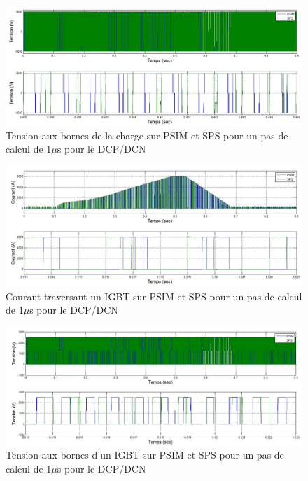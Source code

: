 \begin{figure}[htb]
\centering
\includegraphics[scale=0.5]{fig/DCPDCN/DCPTensionCharge1u.jpg}
\caption{Tension aux bornes de la charge sur PSIM et SPS pour un pas de calcul de 1$\mu$s pour le DCP/DCN}
\label{DC_ch_ten_1}
\end{figure}


\begin{figure}[htb]
\centering
\includegraphics[scale=0.5]{fig/DCPDCN/DCPCourantIGBT1u.jpg}
\caption{Courant traversant un IGBT sur PSIM et SPS pour un pas de calcul de 1$\mu$s pour le DCP/DCN}
\label{DC_IG_cou_1}
\end{figure}


\begin{figure}[htb]
\centering
\includegraphics[scale=0.5]{fig/DCPDCN/DCPTensionIGBT1u.jpg}
\caption{Tension aux bornes d'un IGBT sur PSIM et SPS pour un pas de calcul de 1$\mu$s pour le DCP/DCN}
\label{DC_IG_ten_1}
\end{figure}


